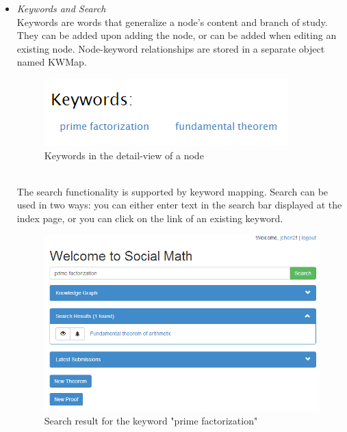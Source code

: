 \documentclass{acm_proc_article-sp}
\begin{document}
\begin{itemize}
\item \emph{Keywords and Search} \\
Keywords are words that generalize a node's content and branch of study. They can be added upon adding the node, or can be added when editing an existing node. Node-keyword relationships are stored in a separate object named KWMap. 
\begin{figure}[h!]
\centering
\includegraphics[scale=0.8]{keyword.png}
\caption{Keywords in the detail-view of a node}
\end{figure}\\
The search functionality is supported by keyword mapping. Search can be used in two ways: you can either enter text in the search bar displayed at the index page, or you can click on the link of an existing keyword. 
\begin{figure}[h!]
\centering
\includegraphics[scale=0.4]{search.png}
\caption{Search result for the keyword "prime factorization"}
\end{figure}\


\end{itemize}
\end{document}
